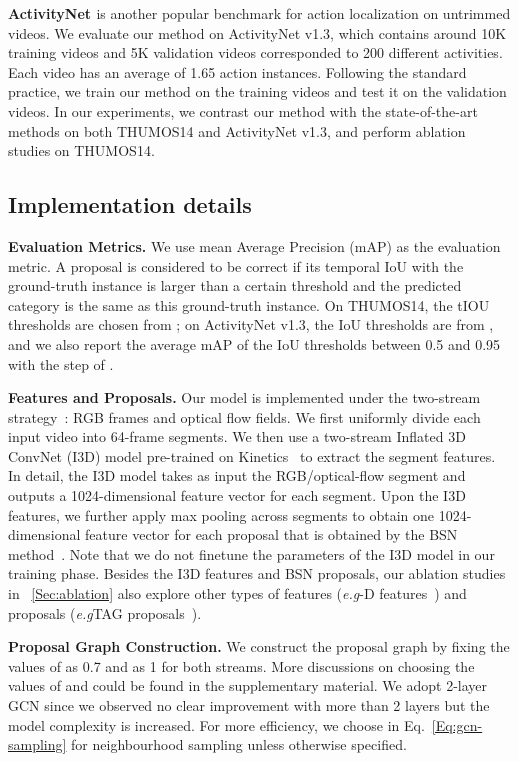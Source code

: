 \documentclass[10pt,twocolumn,letterpaper]{article}
\def\eg{\emph{e.g}\onedot} \def\Eg{\emph{E.g}\onedot}
\begin{document}
	\textbf{ActivityNet \cite{caba2015activitynet}} is another popular benchmark for action localization on untrimmed videos. We evaluate our method on ActivityNet v1.3, which contains around 10K training videos and 5K validation videos corresponded to 200 different activities. Each video has an average of 1.65 action instances. Following the standard practice, we train our method on the training videos and test it on the validation videos. In our experiments, we contrast our method with the state-of-the-art methods on both THUMOS14 and ActivityNet v1.3, and perform ablation studies on THUMOS14.
	


	\subsection{Implementation details}
	
	\noindent \textbf{Evaluation Metrics.} We use mean Average Precision (mAP) as the evaluation metric. 
	A proposal is considered to be correct if its temporal IoU with the ground-truth instance is larger than a certain threshold and the predicted category is the same as this ground-truth instance.
	On THUMOS14, the tIOU thresholds are chosen from ; on ActivityNet v1.3, the IoU thresholds are from , and we also report the average mAP of the IoU thresholds between 0.5 and 0.95 with the step of .
	
	\noindent \textbf{Features and Proposals.}
	Our model is implemented under the two-stream strategy~\cite{simonyan2014two}: RGB frames and optical flow fields.
	We first uniformly divide each input video into 64-frame segments. We then use a two-stream Inflated 3D ConvNet (I3D) model pre-trained on Kinetics~\cite{carreira2017quo} to extract the segment features. In detail, the I3D model takes as input the RGB/optical-flow segment and outputs a 1024-dimensional feature vector for each segment. Upon the I3D features, we further apply max pooling across segments to obtain one 1024-dimensional feature vector for each proposal that is obtained by the BSN method~\cite{lin2018bsn}. Note that we do not finetune the parameters of the I3D model in our training phase. 
	Besides the I3D features and BSN proposals, our ablation studies in \textsection~\ref{Sec:ablation} also explore other types of features (\eg 2-D features~\cite{lin2018bsn}) and proposals  (\eg TAG proposals~\cite{zhao2017temporal}). 
	
	
	\noindent \textbf{Proposal Graph Construction.}
	We construct the proposal graph by fixing the values of  as 0.7 and   as 1 for both streams. More discussions on choosing the values of  and  could be found in the supplementary material. We adopt 2-layer GCN since we observed no clear improvement with more than 2 layers but the model complexity is increased. For more efficiency, we choose  in Eq.~\eqref{Eq:gcn-sampling} for neighbourhood sampling unless otherwise specified.
	
\end{document}
